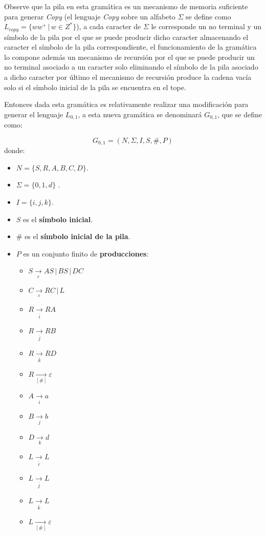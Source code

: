 \documentclass[12pt]{article}
\begin{document}
Observe que la pila en esta gramática es un mecanismo de memoria suficiente para generar \textit{Copy} (el lenguaje \textit{Copy} sobre un alfabeto
$\Sigma$ se define como $L_{copy}=\{ww^+\,|\,w\in Z^*\}$), a cada caracter de $\Sigma$ le corresponde un no terminal y un símbolo de la pila 
por el que se puede producir dicho caracter almacenando el caracter el símbolo de la pila correspondiente, el funcionamiento 
de la gramática lo compone además un mecanismo de recursión por el que se puede producir un no terminal asociado a un caracter
solo eliminando el símbolo de la pila asociado a dicho caracter por último el mecanismo de recursión produce la cadena vacía
solo si el símbolo inicial de la pila se encuentra en el tope.

Entonces dada esta gramática es relativamente realizar una modificación para generar el lenguaje $L_{0,1}$,
a esta nueva gramática se denominará $G_{0,1}$, que se define como:

$$
    G_{0,1} = (N, \Sigma, I, S, \#, P) 
$$
donde:

\begin{itemize}
    \item $N= \{S,R,A,B,C,D\}$.
    \item \( \Sigma=\{0,1,d\} \) .
    \item $I=\{i,j,k\}$.
    \item $S$ es el \textbf{símbolo inicial}.
    \item $\#$ es el \textbf{símbolo inicial de la pila}.
    \item $P$ es un conjunto finito de \textbf{producciones}:
          \begin{multicols}{2}
              \begin{itemize}
                  \item $S\underset{\varepsilon}{\to} AS\,|\,BS\,|\,DC$
                  \item $C\underset{\varepsilon}{\to} RC\,|\,L$
                  \item $R\underset{\overline{i}}{\to} RA$
                  \item $R\underset{\overline{j}}{\to} RB$
                  \item $R\underset{\overline{k}}{\to} RD$
                        
                  \item $R\underset{[\#]}{\to} \varepsilon$
                  \item $A\underset{i}{\to} a$
                  \item $B\underset{j}{\to} b$
                  \item $D\underset{k}{\to} d$
                  \item $L\underset{\overline{i}}{\to} L$
                  \item $L\underset{\overline{j}}{\to} L$
                  \item $L\underset{\overline{k}}{\to} L$
                  \item $L\underset{[\#]}{\to} \varepsilon$
              \end{itemize}
          \end{multicols}
\end{itemize}
\end{document}
